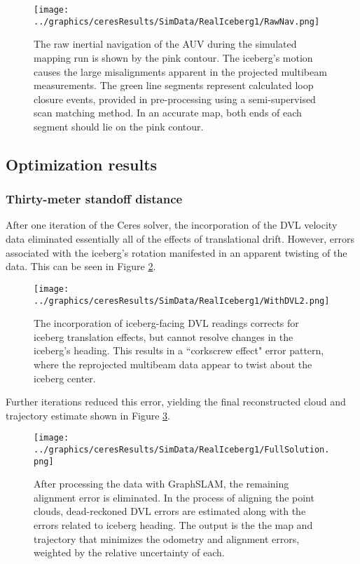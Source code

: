  \begin{figure}[!htb]
   \centering
   \texttt{[image: ../graphics/ceresResults/SimData/RealIceberg1/RawNav.png]} %
   \caption{The raw inertial navigation of the AUV during the simulated mapping run is shown by the pink contour. The iceberg's motion causes the large misalignments apparent in the projected multibeam measurements. The green line segments represent calculated loop closure events, provided in pre-processing using a semi-supervised scan matching method. In an accurate map, both ends of each segment should lie on the pink contour.}
   \label{fig:RawNav}
\end{figure}

\subsection{Optimization results}

\subsubsection{Thirty-meter standoff distance}

After one iteration of the Ceres solver, the incorporation of the DVL velocity data eliminated essentially all of the effects of translational drift.  However, errors associated with the iceberg's rotation manifested in an apparent twisting of the data. This can be seen in Figure \ref{fig:WithDVL1}.

\begin{figure}[!htb]
   \centering
   \texttt{[image: ../graphics/ceresResults/SimData/RealIceberg1/WithDVL2.png]} %
   \caption{The incorporation of iceberg-facing DVL readings corrects for iceberg translation effects, but cannot resolve changes in the iceberg's heading. This results in a ``corkscrew effect" error pattern, where the reprojected multibeam data appear to twist about the iceberg center.}
   \label{fig:WithDVL1}
\end{figure}

Further iterations reduced this error, yielding the final reconstructed cloud and trajectory estimate shown in Figure \ref{fig:FullSimSol}.

 \begin{figure}[!htb]
   \centering
   \texttt{[image: ../graphics/ceresResults/SimData/RealIceberg1/FullSolution.png]} %
   \caption{After processing the data with GraphSLAM, the remaining alignment error is eliminated. In the process of aligning the point clouds, dead-reckoned DVL errors are estimated along with the errors related to iceberg heading. The output is the the map and trajectory that minimizes the odometry and alignment errors, weighted by the relative uncertainty of each. }
   \label{fig:FullSimSol}
\end{figure}

